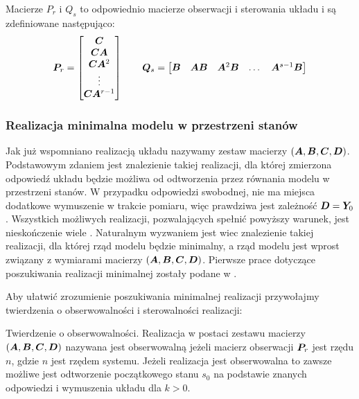 Macierze $P_r$ i $Q_s$ to odpowiednio macierze obserwacji i sterowania układu i są zdefiniowane następująco:
\begin{equation}
	\bm{P}_r = \begin{bmatrix}
		\bm{C} \\ 
		\bm{CA} \\
		\bm{CA}^2\\
		\vdots \\
		\bm{CA}^{r-1}\\
	\end{bmatrix}
	\qquad
	\bm{Q}_s = \begin{bmatrix}
	\bm{B} & \bm{AB} & \bm{A}^2\bm{B} & \dots & \bm{A}^{s-1}\bm{B}    
\end{bmatrix}	
\end{equation}

\subsubsection{Realizacja minimalna modelu w przestrzeni stanów}

Jak już wspomniano realizacją układu nazywamy zestaw macierzy $(\bm{A},\bm{B},\bm{C},\bm{D})$. Podstawowym zdaniem jest znalezienie takiej realizacji, dla której zmierzona odpowiedź układu będzie możliwa od odtworzenia przez równania modelu w przestrzeni stanów. W przypadku odpowiedzi swobodnej, nie ma miejsca dodatkowe wymuszenie w trakcie pomiaru, więc prawdziwa jest zależność $\bm{D}=\bm{Y}_0$. Wszystkich możliwych realizacji, pozwalających spełnić powyższy warunek, jest nieskończenie wiele \parencite{Juang1985}. Naturalnym wyzwaniem jest wiec znalezienie takiej realizacji, dla której rząd modelu będzie minimalny, a rząd modelu jest wprost związany z wymiarami macierzy $(\bm{A},\bm{B},\bm{C},\bm{D})$. Pierwsze prace dotyczące poszukiwania realizacji minimalnej zostały podane w \parencite{Kalman1963,Ho1966}.

Aby ułatwić zrozumienie poszukiwania minimalnej realizacji przywołajmy twierdzenia o obserwowalności i sterowalności realizacji:

Twierdzenie o obserwowalności. Realizacja w postaci zestawu macierzy $(\bm{A},\bm{B},\bm{C},\bm{D})$ nazywana jest obserwowalną jeżeli macierz obserwacji $\bm{P}_r$ jest rzędu $n$, gdzie $n$ jest rzędem systemu. Jeżeli realizacja jest obserwowalna to zawsze możliwe jest odtworzenie początkowego stanu $s_0$ na podstawie znanych odpowiedzi i wymuszenia układu dla $k>0$.

